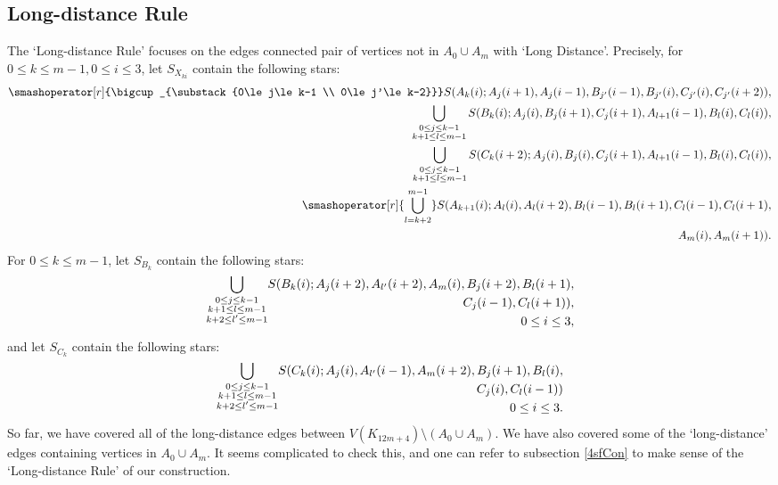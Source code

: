 \documentclass{article}
\begin{document}
\subsection{Long-distance Rule}\label{subsec:long-dist}
The `Long-distance Rule' focuses on the edges connected pair of vertices not in $A_0\cup A_m$ with `Long Distance'. Precisely, for $0\le k\le m-1, 0\le i\le3$,
let $S_{X_{ki}}$ contain the following stars:
\begin{align*}
		\smashoperator[r]{\bigcup_{\substack{0\le j\le k-1 \\ 0\le j'\le k-2}}} 
        S (A_k(i); A_{j}(i+1), 
        A_{j}(i-1),
        B_{j'}(i-1),
        B_{j'}(i),
        C_{j'}(i), 
        C_{j'}(i+2) ),\\
        \bigcup_{\substack{0\le j\le k-1 \\ k+1\le l\le m-1}}
		S (B_k(i); A_{j}(i),
        B_{j}(i+1),
        C_{j}(i+1), 
        A_{l+1}(i-1), 
        B_l(i), 
        C_l(i) ),\\
        \bigcup_{\substack{0\le j\le k-1 \\ k+1\le l\le m-1}}
		S (C_k(i+2); A_{j}(i),
        B_{j}(i),
        C_{j}(i+1), 
        A_{l+1}(i-1), 
        B_l(i), 
        C_l(i) ),\\
        \smashoperator[r]{\bigcup_{l=k+2}^{m-1} }
		S (A_{k+1}(i); 
        A_l(i), 
        A_l(i+2), 
        B_l(i-1), 
        B_l(i+1), 
        C_l(i-1), 
        C_l(i+1), \\
        A_m(i), A_m(i+1) ).
\end{align*}
For $0\le k\le m-1$,
let $S_{B_k}$ contain the following stars:
\begin{align*}
        \smash{\bigcup_{\substack{0\le j\le k-1 \\ k+1\le l\le m-1 \\ k+2\le l'\le m-1 }}}
		S (B_k(i); A_j(i+2), A_{l'}(i+2), A_m(i), B_j(i+2), B_l(i+1),\\ C_j(i-1), C_l(i+1) ),\\~~0\le i\le3,
\end{align*}
and let $S_{C_k}$ contain the following stars:
\begin{align*}
        \smash{\bigcup_{\substack{0\le j\le k-1 \\ k+1\le l\le m-1 \\ k+2\le l'\le m-1 }}}
		S (C_k(i); A_j(i), A_{l'}(i-1), A_m(i+2), B_j(i+1), B_l(i), \\ C_j(i), C_l(i-1) )\\ ~~0\le i\le3.
\end{align*}
So far, we have covered all of the long-distance edges between $V(K_{12m+4})\setminus(A_0\cup A_m)$. We have also covered some of the `long-distance' edges containing vertices in $A_0\cup A_m$. It seems complicated to check this, and one can refer to subsection \ref{4sfCon} to make sense of the `Long-distance Rule' of our construction.
	
\end{document}
